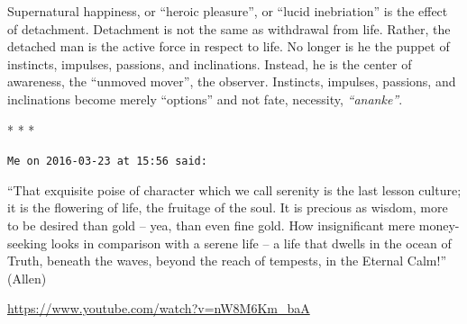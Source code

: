 Supernatural happiness, or ``heroic pleasure'', or ``lucid inebriation'' is the effect of detachment. Detachment is not the same as withdrawal from life. Rather, the detached man is the active force in respect to life. No longer is he the puppet of instincts, impulses, passions, and inclinations. Instead, he is the center of awareness, the ``unmoved mover'', the observer. Instincts, impulses, passions, and inclinations become merely ``options'' and not fate, necessity, \emph{``ananke''}.



\begin{center}* * *\end{center}

\begin{footnotesize}
\begin{sffamily}
\texttt{Me on 2016-03-23 at 15:56 said:}

``That exquisite poise of character which we call serenity is the last lesson culture; it is the flowering of life, the fruitage of the soul. It is precious as wisdom, more to be desired than gold -- yea, than even fine gold. How insignificant mere money-seeking looks in comparison with a serene life -- a life that dwells in the ocean of Truth, beneath the waves, beyond the reach of tempests, in the Eternal Calm!'' (Allen)

\url{https://www.youtube.com/watch?v=nW8M6Km\_baA}



\hfill

\end{sffamily}
\end{footnotesize}

